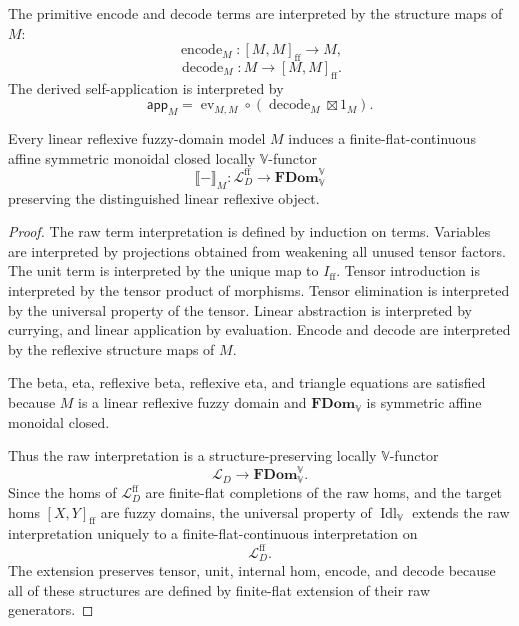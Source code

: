 The primitive encode and decode terms are interpreted by the structure maps
of \(M\):
\[
    \operatorname{encode}_M:
    [M,M]_{\mathrm{ff}}\to M,
\]
\[
    \operatorname{decode}_M:
    M\to [M,M]_{\mathrm{ff}}.
\]
The derived self-application is interpreted by
\[
    \mathsf{app}_M
    =
    \operatorname{ev}_{M,M}
    \circ
    (\operatorname{decode}_M\boxtimes 1_M).
\]

\begin{theorem}
\label{thm:interpretation-theorem-affine-linear}
Every linear reflexive fuzzy-domain model \(M\) induces a finite-flat-continuous
affine symmetric monoidal closed locally \(\mathbb V\)-functor
\[
    \llbracket-\rrbracket_M:
    \mathcal L_D^{\mathrm{ff}}
    \longrightarrow
    \mathbf{FDom}_{\mathbb V}^{\mathbb V}
\]
preserving the distinguished linear reflexive object.
\end{theorem}

\begin{proof}
The raw term interpretation is defined by induction on terms.  Variables are
interpreted by projections obtained from weakening all unused tensor factors.
The unit term is interpreted by the unique map to \(I_{\mathrm{ff}}\).  Tensor
introduction is interpreted by the tensor product of morphisms.  Tensor
elimination is interpreted by the universal property of the tensor.  Linear
abstraction is interpreted by currying, and linear application by evaluation.
Encode and decode are interpreted by the reflexive structure maps of \(M\).

The beta, eta, reflexive beta, reflexive eta, and triangle equations are
satisfied because \(M\) is a linear reflexive fuzzy domain and
\(\mathbf{FDom}_{\mathbb V}\) is symmetric affine monoidal closed.

Thus the raw interpretation is a structure-preserving locally
\(\mathbb V\)-functor
\[
    \mathcal L_D
    \to
    \mathbf{FDom}_{\mathbb V}^{\mathbb V}.
\]
Since the homs of \(\mathcal L_D^{\mathrm{ff}}\) are finite-flat completions
of the raw homs, and the target homs \([X,Y]_{\mathrm{ff}}\) are fuzzy
domains, the universal property of \(\operatorname{Idl}_{\mathbb V}\) extends
the raw interpretation uniquely to a finite-flat-continuous interpretation on
\[
    \mathcal L_D^{\mathrm{ff}}.
\]
The extension preserves tensor, unit, internal hom, encode, and decode because
all of these structures are defined by finite-flat extension of their raw
generators.
\end{proof}


